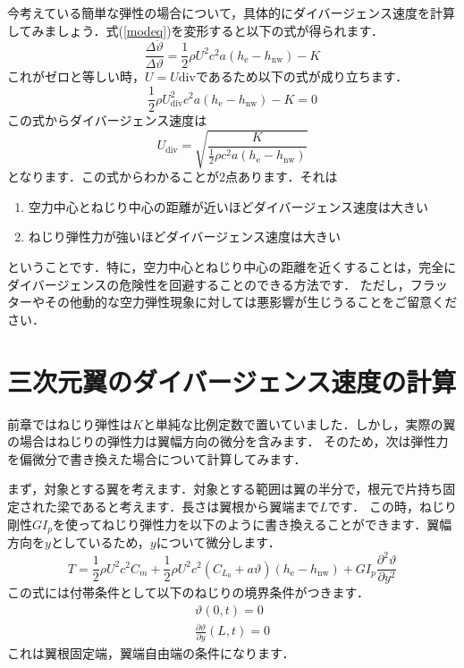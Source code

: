 \documentclass{jarticle}
\begin{document}
今考えている簡単な弾性の場合について，具体的にダイバージェンス速度を計算してみましょう．式(\ref{modeq})を変形すると以下の式が得られます．
\begin{equation}
    \frac{\Delta \ddot{\vartheta}}{\Delta \vartheta} = \frac{1}{2}\rho U^2 c^2 a  (h_\mathrm{e}-h_\mathrm{nw}) - K
\end{equation}
これがゼロと等しい時，$U=U\mathrm{div}$であるため以下の式が成り立ちます．
\begin{equation}\label{Tv}
    \frac{1}{2}\rho U_\mathrm{div}^2 c^2 a  (h_\mathrm{e}-h_\mathrm{nw}) - K = 0
\end{equation}
この式からダイバージェンス速度は
\begin{equation}
    U_\mathrm{div} = \sqrt{\frac{K}{\frac{1}{2}\rho c^2 a  (h_\mathrm{e}-h_\mathrm{nw})}}
\end{equation}
となります．この式からわかることが2点あります．それは
\begin{enumerate}
    \item 空力中心とねじり中心の距離が近いほどダイバージェンス速度は大きい
    \item ねじり弾性力が強いほどダイバージェンス速度は大きい
\end{enumerate}
ということです．特に，空力中心とねじり中心の距離を近くすることは，完全にダイバージェンスの危険性を回避することのできる方法です．
ただし，フラッターやその他動的な空力弾性現象に対しては悪影響が生じうることをご留意ください．

\section{三次元翼のダイバージェンス速度の計算}

前章ではねじり弾性は$K$と単純な比例定数で置いていました．しかし，実際の翼の場合はねじりの弾性力は翼幅方向の微分を含みます．
そのため，次は弾性力を偏微分で書き換えた場合について計算してみます．

まず，対象とする翼を考えます．対象とする範囲は翼の半分で，根元で片持ち固定された梁であると考えます．長さは翼根から翼端まで$L$です．
この時，ねじり剛性$GI_p$を使ってねじり弾性力を以下のように書き換えることができます．翼幅方向を$y$としているため，$y$について微分します．
\begin{equation} \label{gip}
    T = \frac{1}{2}\rho U^2 c^2 C_m + \frac{1}{2}\rho U^2 c^2 (C_{L_0} + a\vartheta)  (h_\mathrm{e}-h_\mathrm{nw}) + GI_p \frac{\partial^2 \vartheta}{\partial y^2}
\end{equation}
この式には付帯条件として以下のねじりの境界条件がつきます．
\begin{align}
    \vartheta(0,t) = 0 \\
    \frac{\partial \vartheta}{\partial y}(L,t) = 0
\end{align}
これは翼根固定端，翼端自由端の条件になります．
\end{document}
